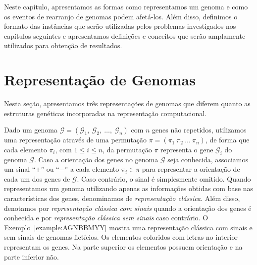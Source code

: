 
Neste capítulo, apresentamos as formas como representamos um genoma e como os eventos de rearranjo de genomas podem afetá-los. Além disso, definimos o formato das instâncias que serão utilizadas pelos problemas investigados nos capítulos seguintes e apresentamos definições e conceitos que serão amplamente utilizados para obtenção de resultados.

\section{Representação de Genomas}

Nesta seção, apresentamos três representações de genomas que diferem quanto as estruturas genéticas incorporadas na representação computacional.

Dado um genoma $\mathcal{G}=(\mathcal{G}_1,\:\mathcal{G}_2,\allowbreak\:\dots,\:\mathcal{G}_n)$ com $n$ genes não repetidos, utilizamos uma representação através de uma permutação $\pi=(\pi_1~\pi_2~\dots~\pi_n)$, de forma que cada elemento $\pi_i$, com $1 \le i \le n$, da permutação $\pi$ representa o gene $\mathcal{G}_i$ do genoma $\mathcal{G}$. Caso a orientação dos genes no genoma $\mathcal{G}$ seja conhecida, associamos um sinal ``$+$'' ou ``$-$'' a cada elemento $\pi_i \in \pi$ para representar a orientação de cada um dos genes de $\mathcal{G}$. Caso contrário, o sinal é simplesmente omitido. Quando representamos um genoma utilizando apenas as informações obtidas com base nas características dos genes, denominamos de \emph{representação clássica}. Além disso, denotamos por \emph{representação clássica com sinais} quando a orientação dos genes é conhecida e por \emph{representação clássica sem sinais} caso contrário. O Exemplo~\ref{example:AGNBBMYY} mostra uma representação clássica com sinais e sem sinais de genomas fictícios. Os elementos coloridos com letras no interior representam os genes. Na parte superior os elementos possuem orientação e na parte inferior não.



